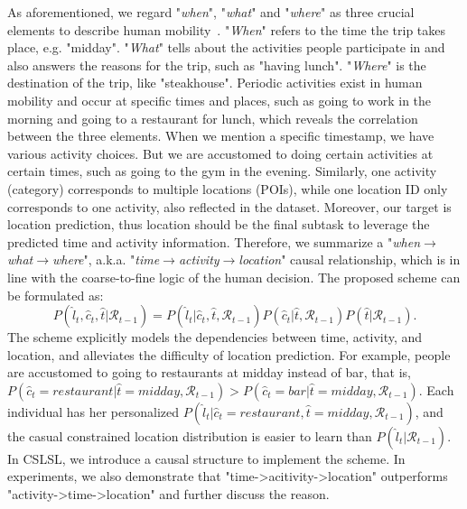\documentclass[sigconf]{acmart}
\begin{document}
    As aforementioned, we regard "\textit{when}", "\textit{what}" and "\textit{where}" as three crucial elements to describe human mobility~\cite{zhang2021putting,pacheco2022predictability}. "\textit{When}" refers to the time the trip takes place, e.g. "midday". "\textit{What}" tells about the activities people participate in and also answers the reasons for the trip, such as "having lunch". "\textit{Where}" is the destination of the trip, like "steakhouse". Periodic activities exist in human mobility and occur at specific times and places, such as going to work in the morning and going to a restaurant for lunch, which reveals the correlation between the three elements. 
    When we mention a specific timestamp, we have various activity choices. But we are accustomed to doing certain activities at certain times, such as going to the gym in the evening. Similarly, one activity (category) corresponds to multiple locations (POIs), while one location ID only corresponds to one activity, also reflected in the dataset. Moreover, our target is location prediction, thus location should be the final subtask to leverage the predicted time and activity information. 
    Therefore, we summarize a "\textit{when$\rightarrow$what$\rightarrow$where}", a.k.a. "\textit{time$\rightarrow$activity$\rightarrow$location}" causal relationship, which is in line with the coarse-to-fine logic of the human decision. 
    The proposed scheme can be formulated as:
    \begin{equation}
        P(\hat{l}_t, \hat{c}_t, \hat{t}|\mathcal{R}_{t-1})=P(\hat{l}_t|\hat{c}_t, \hat{t}, \mathcal{R}_{t-1})P(\hat{c}_t|\hat{t}, \mathcal{R}_{t-1})P(\hat{t}|\mathcal{R}_{t-1}).
    \end{equation}
    The scheme explicitly models the dependencies between time, activity, and location, and alleviates the difficulty of location prediction.
    For example, people are accustomed to going to restaurants at midday instead of bar, that is, $P(\hat{c}_t=restaurant|\hat{t}=midday,\mathcal{R}_{t-1})>P(\hat{c}_t=bar|\hat{t}=midday,\mathcal{R}_{t-1})$. Each individual has her personalized $P(\hat{l}_t|\hat{c}_t=restaurant, \hat{t}=midday, \mathcal{R}_{t-1})$, and the casual constrained location distribution is easier to learn than $P(\hat{l}_t|\mathcal{R}_{t-1})$. In CSLSL, we introduce a causal structure to implement the scheme. In experiments, we also demonstrate that "time->acitivity->location" outperforms "activity->time->location" and further discuss the reason.
    
\end{document}

